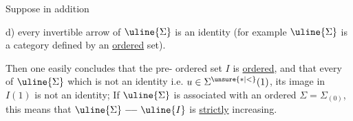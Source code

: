 Suppose in addition

d) every invertible arrow of $\uline{\Sigma}$ is an identity
(for example $\uline{\Sigma}$ is a category defined by an
\uline{ordered} set).

Then one easily concludes that the pre-%
ordered set $I$ is \uline{ordered}, and that every 
of $\uline{\Sigma}$ which is not an identity i.e. $u\in\Sigma^{\unsure{*|<}}(1)$,
its image in $I(1)$ is not an identity;
 If $\uline{\Sigma}$ is associated with an ordered
$\Sigma=\Sigma_{(0)}$, this means that
$\uline{\Sigma}\mathrel{\relbar\joinrel\relbar}\uline{I}$ is 
\uline{strictly} increasing.

